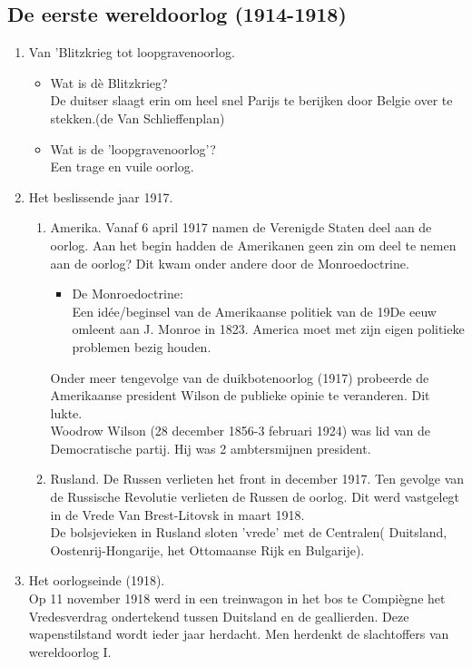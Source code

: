 \documentclass{article}
\begin{document}
\subsection{De eerste wereldoorlog (1914-1918)}
\begin{enumerate}
    \item Van 'Blitzkrieg tot loopgravenoorlog. 
    \begin{itemize}
        \item Wat is dè Blitzkrieg?\\
        De duitser slaagt erin om heel snel Parijs te berijken door Belgie over te stekken.(de Van Schlieffenplan)
        \item Wat is de 'loopgravenoorlog'?\\
        Een trage en vuile oorlog.
    \end{itemize}
    \item Het beslissende jaar 1917.
    \begin{enumerate}
        \item Amerika.
        \newline
        \newline
        Vanaf 6 april 1917 namen de Verenigde Staten deel aan de oorlog. Aan het begin hadden de Amerikanen geen zin om deel te nemen aan de oorlog? Dit kwam onder andere door de Monroedoctrine.
        \begin{itemize}
            \item De Monroedoctrine:\\
            Een idée/beginsel van de Amerikaanse politiek van de 19De eeuw omleent aan J. Monroe in 1823. America moet met zijn eigen politieke problemen bezig houden.
        \end{itemize}
        Onder meer tengevolge van de duikbotenoorlog (1917) probeerde de Amerikaanse president Wilson de publieke opinie te veranderen. Dit lukte.\\
        \newline
        Woodrow Wilson (28 december 1856-3 februari 1924) was lid van de Democratische partij. Hij was 2 ambtersmijnen president.\\
        \item Rusland.
        \newline
        \newline
        De Russen verlieten het front in december 1917. Ten gevolge van de Russische Revolutie verlieten de Russen de oorlog. Dit werd vastgelegt in de Vrede Van Brest-Litovsk in maart 1918.\\
        \newline
        De bolsjevieken in Rusland sloten 'vrede' met de Centralen( Duitsland, Oostenrij-Hongarije, het Ottomaanse Rijk en Bulgarije).
    \end{enumerate}
    \item Het oorlogseinde (1918).\\
    Op 11 november 1918 werd in een treinwagon in het bos te Compiègne het Vredesverdrag ondertekend tussen Duitsland en de geallierden. Deze wapenstilstand wordt ieder jaar herdacht. Men herdenkt de slachtoffers van wereldoorlog I.
\end{enumerate}
\end{document}
